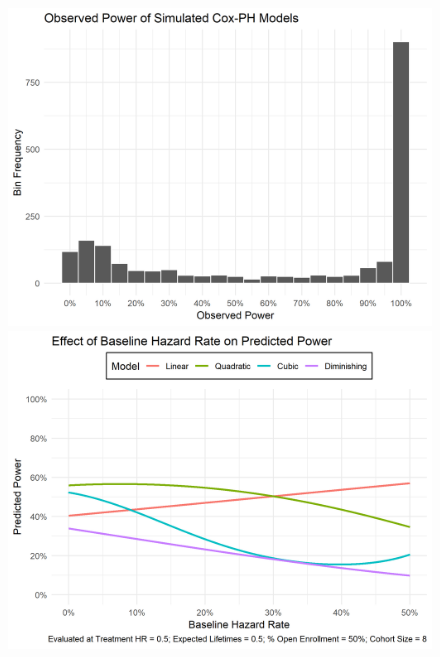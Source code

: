 





\begin{figure}
\centering
\caption[Observed Power of Simulated Cox-PH Models]{}
\label{fig:hist}
\includegraphics[width=\textwidth]{reports/figures/simulation-histogram.png}

\caption[Effect of Baseline Hazard Rate on Power]{}
\label{fig:power-baseline-hazard}
\includegraphics[width=\textwidth]{reports/figures/single-effects/power-baseline-hazard.png}
\end{figure}

